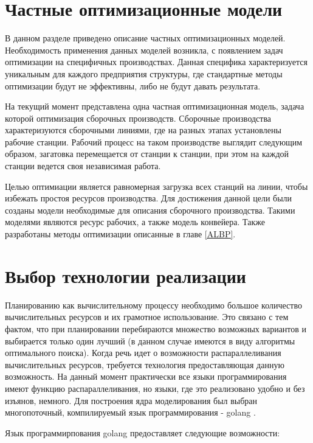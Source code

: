 \section{Частные оптимизационные модели}

В данном разделе приведено описание частных оптимизационных моделей. Необходимость применения данных моделей возникла, с появлением задач оптимизации на специфичных производствах. Данная специфика характеризуется уникальным для каждого предприятия структуры, где стандартные методы оптимизации будут не эффективны, либо не будут давать результата.

На текущий момент представлена одна частная оптимизационная модель, задача которой оптимизация сборочных производств. Сборочные производства характеризуются сборочными линиями, где на разных этапах установлены рабочие станции. Рабочий процесс на таком производстве выглядит следующим образом, загатовка перемещается от станции к станции, при этом на каждой станции ведется своя независимая работа.

Целью оптимиации является равномерная загрузка всех станций на линии, чтобы избежать простоя ресурсов производства. Для достижения данной цели были созданы модели необходимые для описания сборочного производства. Такими моделями являются ресурс рабочих, а также модель конвейера. Также разработаны методы оптимизации описанные в главе \ref{ALBP}.

\section{Выбор технологии реализации}

Планированию как вычислительному процессу необходимо большое количество вычислительных ресурсов и их грамотное использование. Это связано с тем фактом, что при планировании перебираются множество возможных вариантов и выбирается только один лучший (в данном случае имеются в виду алгоритмы оптимального поиска). Когда речь идет о возможности распараллеливания вычислительных ресурсов, требуется технология предоставляющая данную возможность. На данный момент практически все языки программирования имеют функцию распараллеливания, но языки, где это реализовано удобно и без изъянов, немного.  Для построения ядра моделирования был выбран многопоточный, компилируемый язык программирования - golang \cite{golangBook}.

Язык программирпования golang предоставляет следующие возможности:

